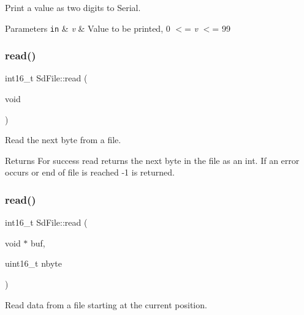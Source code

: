 Print a value as two digits to Serial.


\begin{DoxyParams}[1]{Parameters}
\mbox{\tt in}  & {\em v} & Value to be printed, 0 $<$= {\itshape v} $<$= 99 \\
\hline
\end{DoxyParams}
\mbox{\label{class_sd_file_a6c389f0180b4a86fb6d7464f50d3b0dd}} 
\subsubsection{\texorpdfstring{read()}{read()}\hspace{0.1cm}{\footnotesize\ttfamily [1/2]}}
{\footnotesize\ttfamily int16\+\_\+t Sd\+File\+::read (\begin{DoxyParamCaption}\item[{void}]{ }\end{DoxyParamCaption})\hspace{0.3cm}{\ttfamily [inline]}}

Read the next byte from a file.

\begin{DoxyReturn}{Returns}
For success read returns the next byte in the file as an int. If an error occurs or end of file is reached -\/1 is returned. 
\end{DoxyReturn}
\mbox{\label{class_sd_file_a77ad85c5c80b34f8ebc57b5b89730554}} 
\subsubsection{\texorpdfstring{read()}{read()}\hspace{0.1cm}{\footnotesize\ttfamily [2/2]}}
{\footnotesize\ttfamily int16\+\_\+t Sd\+File\+::read (\begin{DoxyParamCaption}\item[{void $\ast$}]{buf,  }\item[{uint16\+\_\+t}]{nbyte }\end{DoxyParamCaption})}

Read data from a file starting at the current position.


